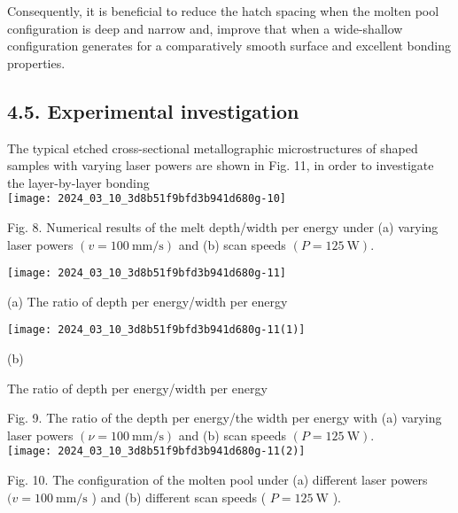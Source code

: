 \documentclass[10pt]{article}
\begin{document}
Consequently, it is beneficial to reduce the hatch spacing when the molten pool configuration is deep and narrow and, improve that when a wide-shallow configuration generates for a comparatively smooth surface and excellent bonding properties.

\subsection*{4.5. Experimental investigation}
The typical etched cross-sectional metallographic microstructures of shaped samples with varying laser powers are shown in Fig. 11, in order to investigate the layer-by-layer bonding\\
\texttt{[image: 2024\_03\_10\_3d8b51f9bfd3b941d680g-10]}

Fig. 8. Numerical results of the melt depth/width per energy under (a) varying laser powers $(v=100 \mathrm{~mm} / \mathrm{s})$ and (b) scan speeds $(P=125 \mathrm{~W})$.

\begin{center}
\texttt{[image: 2024\_03\_10\_3d8b51f9bfd3b941d680g-11]}
\end{center}

(a) The ratio of depth per energy/width per energy

\begin{center}
\texttt{[image: 2024\_03\_10\_3d8b51f9bfd3b941d680g-11(1)]}
\end{center}

(b)

The ratio of depth per energy/width per energy

Fig. 9. The ratio of the depth per energy/the width per energy with (a) varying laser powers $(\nu=100 \mathrm{~mm} / \mathrm{s})$ and (b) scan speeds $(P=125 \mathrm{~W})$.\\
\texttt{[image: 2024\_03\_10\_3d8b51f9bfd3b941d680g-11(2)]}

Fig. 10. The configuration of the molten pool under (a) different laser powers $(v=100 \mathrm{~mm} / \mathrm{s}$ ) and (b) different scan speeds ( $P=125 \mathrm{~W}$ ).
\end{document}
